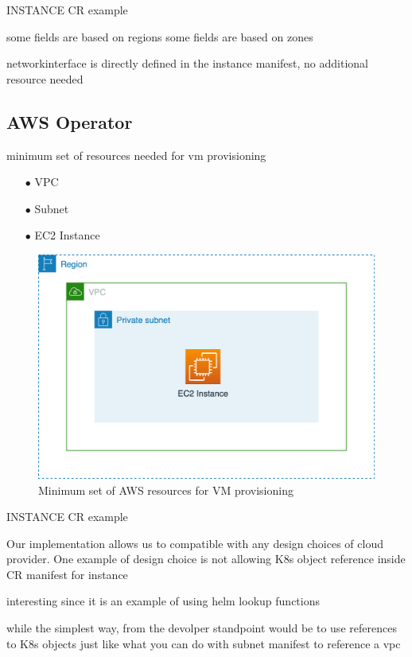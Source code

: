 INSTANCE CR example

some fields are based on regions
some fields are based on zones


networkinterface is directly defined in the instance manifest,
no additional resource needed



\subsection{AWS Operator}

minimum set of resources needed for vm provisioning

\begin{itemize}[itemsep=0.2pt, topsep=1pt] 
\item[$\bullet$] VPC
\item[$\bullet$] Subnet
\item[$\bullet$] EC2 Instance
\end{itemize}






\begin{figure}[H]
\centering
\includegraphics[width=0.75\linewidth]{images/aws.png}
\caption{Minimum set of AWS resources for VM provisioning}
\label{fig:aws}
\end{figure}

INSTANCE CR example

Our implementation allows us to compatible with any design choices of cloud provider.
One example of design choice is not allowing K8s object reference inside CR manifest 
for instance

interesting since it is an example of using helm lookup functions

while the simplest way, from the devolper standpoint would be to use references to K8s objects just like what you can do with subnet manifest to reference a vpc


